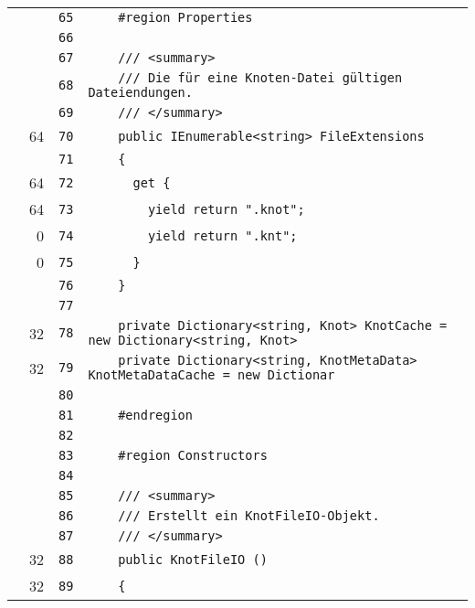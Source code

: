 \documentclass[a4paper,10pt]{article}
\begin{document}
\begin{longtable}[l]{lrrl}
\cellcolor{gray} &  & \verb~65~ & \verb~    #region Properties~\\
\cellcolor{gray} &  & \verb~66~ & \verb~~\\
\cellcolor{gray} &  & \verb~67~ & \verb~    /// <summary>~\\
\cellcolor{gray} &  & \verb~68~ & \verb~    /// Die für eine Knoten-Datei gültigen Dateiendungen.~\\
\cellcolor{gray} &  & \verb~69~ & \verb~    /// </summary>~\\
\cellcolor{green} & 64 & \verb~70~ & \verb~    public IEnumerable<string> FileExtensions~\\
\cellcolor{gray} &  & \verb~71~ & \verb~    {~\\
\cellcolor{green} & 64 & \verb~72~ & \verb~      get {~\\
\cellcolor{green} & 64 & \verb~73~ & \verb~        yield return ".knot";~\\
\cellcolor{red} & 0 & \verb~74~ & \verb~        yield return ".knt";~\\
\cellcolor{red} & 0 & \verb~75~ & \verb~      }~\\
\cellcolor{gray} &  & \verb~76~ & \verb~    }~\\
\cellcolor{gray} &  & \verb~77~ & \verb~~\\
\cellcolor{green} & 32 & \verb~78~ & \verb~    private Dictionary<string, Knot> KnotCache = new Dictionary<string, Knot> ~\\
\cellcolor{green} & 32 & \verb~79~ & \verb~    private Dictionary<string, KnotMetaData> KnotMetaDataCache = new Dictionar~\\
\cellcolor{gray} &  & \verb~80~ & \verb~~\\
\cellcolor{gray} &  & \verb~81~ & \verb~    #endregion~\\
\cellcolor{gray} &  & \verb~82~ & \verb~~\\
\cellcolor{gray} &  & \verb~83~ & \verb~    #region Constructors~\\
\cellcolor{gray} &  & \verb~84~ & \verb~~\\
\cellcolor{gray} &  & \verb~85~ & \verb~    /// <summary>~\\
\cellcolor{gray} &  & \verb~86~ & \verb~    /// Erstellt ein KnotFileIO-Objekt.~\\
\cellcolor{gray} &  & \verb~87~ & \verb~    /// </summary>~\\
\cellcolor{green} & 32 & \verb~88~ & \verb~    public KnotFileIO ()~\\
\cellcolor{green} & 32 & \verb~89~ & \verb~    {~\\

\end{longtable}
\end{document}
